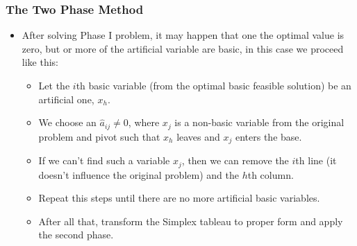 \documentclass{beamer}
\theoremstyle{plain}
\begin{document}
\begin{frame}\frametitle{The Two Phase Method}
\justifying

\begin{itemize}
\justifying

\item After solving Phase I problem, it may happen that one the optimal value is zero, but or more of the artificial variable are basic, in this case we proceed like this:

\begin{itemize}
\justifying

\item Let the $ i $th basic variable (from the optimal basic feasible solution) be an artificial one, $ x_h $. 

\item We choose an $ \widehat{a}_{ij} \ne 0 $, where $ x_j $ is a non-basic variable from the original problem and pivot such that $ x_h $ leaves and $ x_j $ enters the base. 

\item If we can't find such a variable $ x_j $, then we can remove the $ i $th line (it doesn't influence the original problem) and the $ h $th column.

\item Repeat this steps until there are no more artificial basic variables. 

\item After all that, transform the Simplex tableau to proper form and apply the second phase.

\end{itemize}

\end{itemize}

\end{frame}
\end{document}
